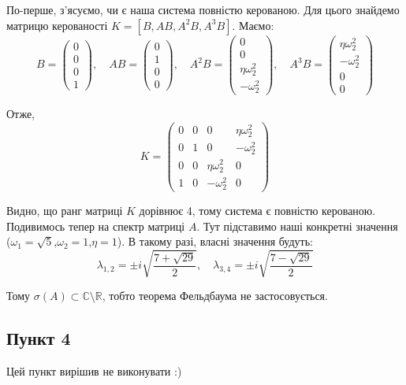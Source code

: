 \documentclass{hw_template}
\begin{document}
По-перше, з'ясуємо, чи є наша система повністю керованою. Для цього знайдемо матрицю керованості $K = [B, AB, A^2B, A^3B]$. Маємо:
\begin{equation*}
    B = \begin{pmatrix}
        0 \\ 0 \\ 0 \\ 1
    \end{pmatrix}, \quad
    AB = \begin{pmatrix}
        0 \\ 1 \\ 0 \\ 0
    \end{pmatrix}, \quad
    A^2B = \begin{pmatrix}
        0 \\ 0 \\ \eta\omega_2^2 \\ -\omega_2^2
    \end{pmatrix}, \quad 
    A^3B = \begin{pmatrix}
        \eta\omega_2^2 \\ -\omega_2^2 \\ 0 \\ 0
    \end{pmatrix}
\end{equation*}

Отже,
\begin{equation*}
    K = \begin{pmatrix}
        0 & 0 & 0 & \eta\omega_2^2 \\
        0 & 1 & 0 & -\omega_2^2 \\
        0 & 0 & \eta\omega_2^2 & 0 \\
        1 & 0 & -\omega_2^2 & 0
    \end{pmatrix}
\end{equation*}

Видно, що ранг матриці $K$ дорівнює 4, тому система є повністю керованою. Подивимось тепер на спектр матриці $A$. Тут підставимо наші конкретні значення ($\omega_1=\sqrt{5}$,$\omega_2=1$,$\eta=1$). В такому разі, власні значення будуть:
\begin{equation*}
    \lambda_{1,2} = \pm i\sqrt{\frac{7+\sqrt{29}}{2}}, \quad \lambda_{3,4} = \pm i\sqrt{\frac{7-\sqrt{29}}{2}}
\end{equation*}

Тому $\sigma(A) \subset \mathbb{C} \setminus \mathbb{R}$, тобто теорема Фельдбаума не застосовується.

\pagebreak

\subsection{Пункт 4}

Цей пункт вирішив не виконувати :)
\end{document}
